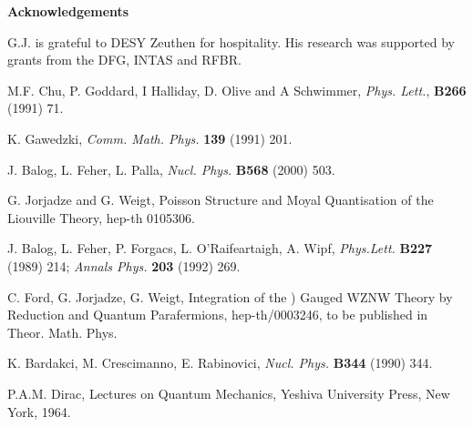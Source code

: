 \documentclass[a4paper,12pt]{article}
\providecommand{\rr}{\mathbb{R}}
\begin{document}
\vspace{0.5cm}

\noindent
{\bf {\Large Acknowledgements}}

\vspace{0.3cm}


G.J. is grateful to DESY Zeuthen for hospitality.  His
research was supported by grants from the DFG, INTAS and RFBR.



\begin{thebibliography}{xx}
\frenchspacing


 M.F. Chu, P. Goddard, I Halliday, D. Olive and A
  Schwimmer, {\it Phys. Lett.}, {\bf B266} (1991) 71.

 K. Gawedzki, {\it Comm. Math. Phys.} {\bf
    139} (1991) 201.

 J. Balog, L. Feher, L. Palla, {\it Nucl. Phys.} {\bf
      B568} (2000) 503.

 G. Jorjadze and G. Weigt, Poisson Structure and Moyal
  Quantisation of the Liouville Theory, hep-th 0105306.

 J. Balog, L. Feher, P. Forgacs, L.
  O'Raifeartaigh, A.  Wipf, {\it Phys.Lett.} {\bf B227} (1989) 214;
  {\it Annals Phys.} {\bf 203} (1992) 269.

 C. Ford, G. Jorjadze, G. Weigt, Integration of the
  \myHighlight{$SL(2,\rr)/U(1$}\coordHE{}) Gauged WZNW Theory by Reduction and Quantum
  Parafermions, hep-th/0003246, to be published in Theor. Math. Phys.

 K. Bardakci, M. Crescimanno, E. Rabinovici,
    {\it Nucl. Phys.} {\bf B344} (1990) 344.

 P.A.M. Dirac, Lectures on Quantum Mechanics,
Yeshiva University Press, New York, 1964.



\end{thebibliography}
\end{document}

